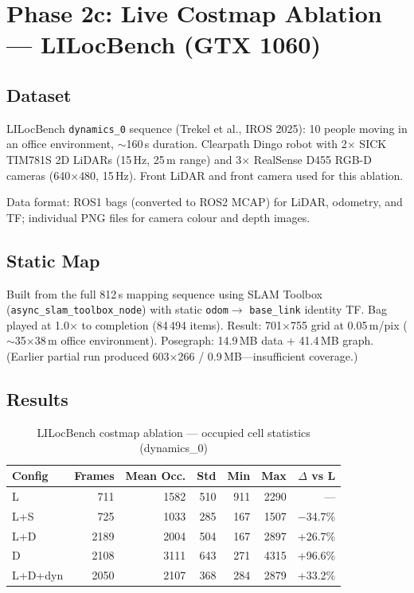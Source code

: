 \documentclass[11pt,a4paper]{article}
\begin{document}
\section{Phase 2c: Live Costmap Ablation --- LILocBench (GTX 1060)}
\label{sec:phase2c}

\subsection{Dataset}

LILocBench \texttt{dynamics\_0} sequence (Trekel et al., IROS 2025):
10 people moving in an office environment, $\sim$160\,s duration.
Clearpath Dingo robot with 2$\times$ SICK TIM781S 2D LiDARs (15\,Hz,
25\,m range) and 3$\times$ RealSense D455 RGB-D cameras (640$\times$480,
15\,Hz).  Front LiDAR and front camera used for this ablation.

Data format: ROS1 bags (converted to ROS2 MCAP) for LiDAR, odometry,
and TF; individual PNG files for camera colour and depth images.

\subsection{Static Map}

Built from the full 812\,s mapping sequence using SLAM Toolbox
(\texttt{async\_slam\_toolbox\_node}) with static \texttt{odom}$\to$%
\texttt{base\_link} identity TF.  Bag played at 1.0$\times$ to
completion (84\,494 items).  Result: 701$\times$755 grid at
0.05\,m/pix ($\sim$35$\times$38\,m office environment).  Posegraph:
14.9\,MB data + 41.4\,MB graph.  (Earlier partial run produced
603$\times$266 / 0.9\,MB---insufficient coverage.)

\subsection{Results}

\begin{table}[h]
\centering
\caption{LILocBench costmap ablation --- occupied cell statistics (dynamics\_0)}
\label{tab:lilocbench-results}
\begin{tabular}{lrrrrrr}
\toprule
\textbf{Config} & \textbf{Frames} & \textbf{Mean Occ.} & \textbf{Std} & \textbf{Min} & \textbf{Max} & \textbf{$\Delta$ vs L} \\
\midrule
L       &  711 & 1582 & 510 &  911 & 2290 & ---       \\
L+S     &  725 & 1033 & 285 &  167 & 1507 & $-$34.7\% \\
L+D     & 2189 & 2004 & 504 &  167 & 2897 & +26.7\%  \\
D       & 2108 & 3111 & 643 &  271 & 4315 & +96.6\%  \\
L+D+dyn & 2050 & 2107 & 368 &  284 & 2879 & +33.2\%  \\
\bottomrule
\end{tabular}
\end{table}
\end{document}
